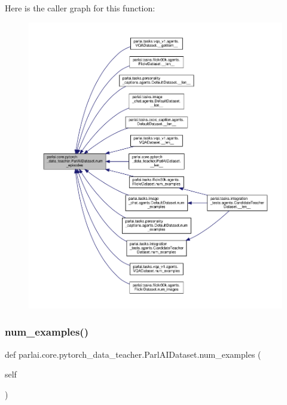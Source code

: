 Here is the caller graph for this function\+:
\nopagebreak
\begin{figure}[H]
\begin{center}
\leavevmode
\includegraphics[width=350pt]{classparlai_1_1core_1_1pytorch__data__teacher_1_1ParlAIDataset_a2b59aeb0c912cbee38cd6cd03f5d58db_icgraph}
\end{center}
\end{figure}
\mbox{\label{classparlai_1_1core_1_1pytorch__data__teacher_1_1ParlAIDataset_afc5ca19cf94aad64c75e7799686efc7c}} 
\subsubsection{\texorpdfstring{num\+\_\+examples()}{num\_examples()}}
{\footnotesize\ttfamily def parlai.\+core.\+pytorch\+\_\+data\+\_\+teacher.\+Parl\+A\+I\+Dataset.\+num\+\_\+examples (\begin{DoxyParamCaption}\item[{}]{self }\end{DoxyParamCaption})}

